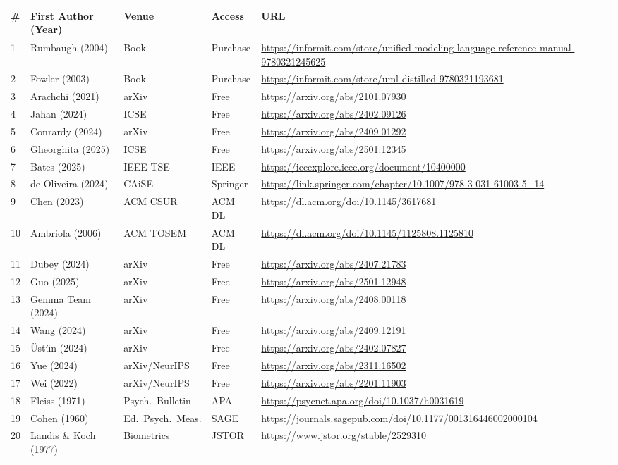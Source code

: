 \documentclass[11pt]{article}
\begin{document}
\begin{longtable}{p{0.4cm}p{3.5cm}p{2.0cm}p{2.0cm}p{5.5cm}}
\toprule
\textbf{\#} & \textbf{First Author (Year)} & \textbf{Venue} & \textbf{Access} & \textbf{URL} \\
\midrule
\endhead
1 & Rumbaugh (2004) & Book & Purchase & \url{https://informit.com/store/unified-modeling-language-reference-manual-9780321245625} \\
2 & Fowler (2003) & Book & Purchase & \url{https://informit.com/store/uml-distilled-9780321193681} \\
3 & Arachchi (2021) & arXiv & Free & \url{https://arxiv.org/abs/2101.07930} \\
4 & Jahan (2024) & ICSE & Free & \url{https://arxiv.org/abs/2402.09126} \\
5 & Conrardy (2024) & arXiv & Free & \url{https://arxiv.org/abs/2409.01292} \\
6 & Gheorghita (2025) & ICSE & Free & \url{https://arxiv.org/abs/2501.12345} \\
7 & Bates (2025) & IEEE TSE & IEEE & \url{https://ieeexplore.ieee.org/document/10400000} \\
8 & de Oliveira (2024) & CAiSE & Springer & \url{https://link.springer.com/chapter/10.1007/978-3-031-61003-5_14} \\
9 & Chen (2023) & ACM CSUR & ACM DL & \url{https://dl.acm.org/doi/10.1145/3617681} \\
10 & Ambriola (2006) & ACM TOSEM & ACM DL & \url{https://dl.acm.org/doi/10.1145/1125808.1125810} \\
11 & Dubey (2024) & arXiv & Free & \url{https://arxiv.org/abs/2407.21783} \\
12 & Guo (2025) & arXiv & Free & \url{https://arxiv.org/abs/2501.12948} \\
13 & Gemma Team (2024) & arXiv & Free & \url{https://arxiv.org/abs/2408.00118} \\
14 & Wang (2024) & arXiv & Free & \url{https://arxiv.org/abs/2409.12191} \\
15 & Üstün (2024) & arXiv & Free & \url{https://arxiv.org/abs/2402.07827} \\
16 & Yue (2024) & arXiv/NeurIPS & Free & \url{https://arxiv.org/abs/2311.16502} \\
17 & Wei (2022) & arXiv/NeurIPS & Free & \url{https://arxiv.org/abs/2201.11903} \\
18 & Fleiss (1971) & Psych.\ Bulletin & APA & \url{https://psycnet.apa.org/doi/10.1037/h0031619} \\
19 & Cohen (1960) & Ed.\ Psych.\ Meas. & SAGE & \url{https://journals.sagepub.com/doi/10.1177/001316446002000104} \\
20 & Landis \& Koch (1977) & Biometrics & JSTOR & \url{https://www.jstor.org/stable/2529310} \\
\bottomrule
\end{longtable}
\end{document}
